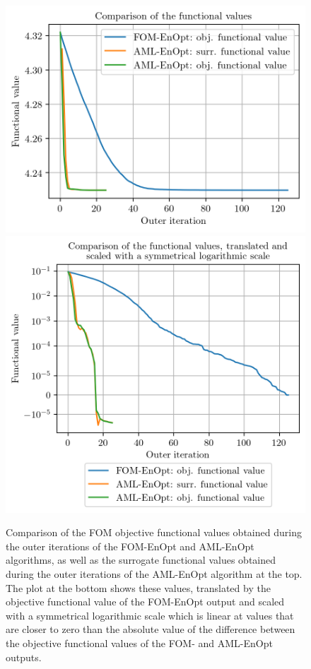 \begin{figure}
\centering
\includegraphics{Plots/functionalValueComp.png}
\includegraphics{Plots/functionalValueCompSymlog.png}
\caption{\label{FOMAMLEnOptFuncValComp}Comparison of the FOM objective functional values obtained during the outer iterations of the FOM-EnOpt and AML-EnOpt algorithms, as well as the surrogate functional values obtained during the outer iterations of the AML-EnOpt algorithm at the top. The plot at the bottom shows these values, translated by the objective functional value of the FOM-EnOpt output and scaled with a symmetrical logarithmic scale which is linear at values that are closer to zero than the absolute value of the difference between the objective functional values of the FOM- and AML-EnOpt outputs.}
\end{figure}

